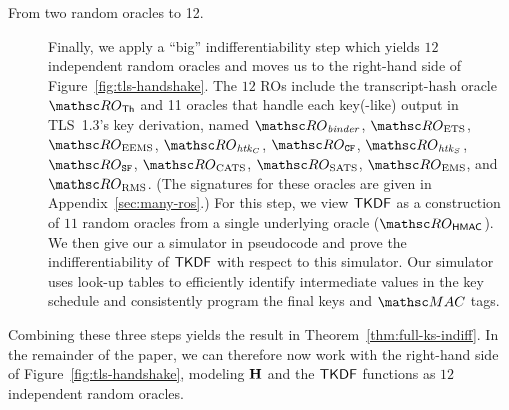 \begin{description}
	\item[From two random oracles to 12.]
	Finally, we apply a ``big'' indifferentiability step which yields $12$ independent random oracles and moves us to the right-hand side of Figure~\ref{fig:tls-handshake}.
	The $12$ ROs include
	the transcript-hash oracle~$\ROthash$ and 11 oracles that handle each key(-like) output in TLS~1.3's key derivation, named
		$\RObinder$,
		$\ROets$,
		$\ROeems$,
		$\ROchtk$,
		$\ROcfin$,
		$\ROshtk$,
		$\ROsfin$,
		$\ROcats$,
		$\ROsats$,
		$\ROems$, and
		$\ROrms$.
	(The signatures for these oracles are given in 
		Appendix~\ref{sec:many-ros}.)
	For this step, we view $\mathsf{TKDF}$ as a construction of $11$ random oracles from a single underlying oracle ($\ROhmac$).
	We then give our a simulator in pseudocode and prove the indifferentiability of $\mathsf{TKDF}$ with respect to this simulator.
	Our simulator uses look-up tables to efficiently identify intermediate values in the key schedule and consistently program the final keys and $\MAC$ tags.
\end{description}

Combining these three steps yields the result in Theorem~\ref{thm:full-ks-indiff}.
In the remainder of the paper, we can therefore now work with the right-hand side of Figure~\ref{fig:tls-handshake}, modeling $\mathbf{H}$ and the $\mathsf{TKDF}$ functions as $12$ independent random oracles.

\iffull
	
\fi

